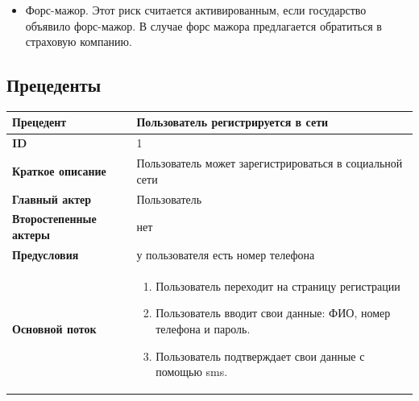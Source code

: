 \begin{itemize}
\begin{itemize}
        \item Невозможность использования веб-сайта в другие страны и регионы из-за политических конфликтов/санкций
          Этот риск считается активированным в случае политических кризисов, вооруженных конфликтов.
          В случае возникновения этого риска предлагается проконсультироваться с юридическим отделом.
    \end{itemize}
\item Форс-мажор. Этот риск считается активированным, если государство объявило форс-мажор.
  В случае форс мажора предлагается обратиться в страховую компанию.
\end{itemize}

\subsection{Прецеденты}
\begin{center}
  \begin{tabular}{|l|p{9cm}|}
  \hline
  \textbf{Прецедент} & Пользователь регистрируется в сети \\
  \hline
  \textbf{ID} & 1 \\
  \hline
  \textbf{Краткое описание} & Пользователь может зарегистрироваться в социальной сети \\
  \hline
  \textbf{Главный актер} & Пользователь\\
  \hline
  \textbf{Второстепенные актеры} & нет \\
  \hline
  \textbf{Предусловия} & у пользователя есть номер телефона \\
  \hline
  \textbf{Основной поток} & \begin{enumerate}
    \item Пользователь переходит на страницу регистрации
    \item Пользователь вводит свои данные: ФИО, номер телефона и пароль.
    \item Пользователь подтверждает свои данные с помощью sms.
  \end{enumerate} \\
  \hline
\end{tabular}
\end{center}


